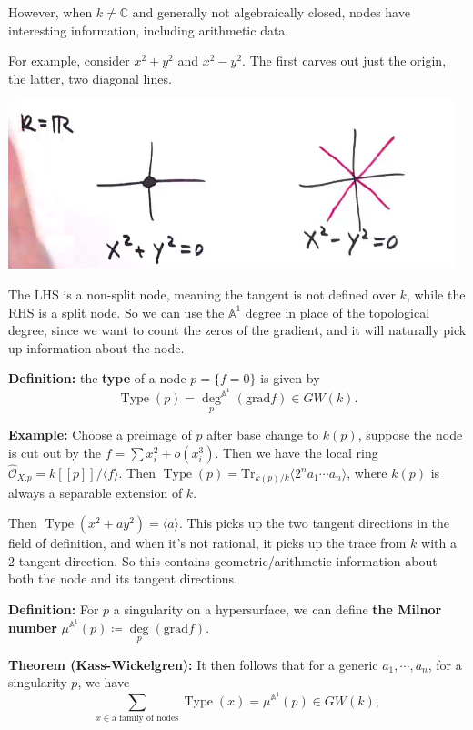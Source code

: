 \documentclass[11pt]{scrreprt}
\theoremstyle{definition}
\newcommand{\CC}[0]{{\mathbb{C}}}
\newcommand{\Af}[0]{{\mathbb{A}}}
\newcommand{\OO}[0]{{\mathcal{O}}}
\newcommand{\Tr}[0]{\mathrm{Tr}}
\newcommand{\grad}[0]{\mathrm{grad}}
\newcommand{\generators}[1]{\langle{#1}\rangle}
\newcommand{\theset}[1]{\{{#1}\}}
\newcommand{\definedas}[0]{\coloneqq}
\begin{document}
However, when \(k\neq \CC\) and generally not algebraically closed,
nodes have interesting information, including arithmetic data.

For example, consider \(x^2+y^2\) and \(x^2-y^2\). The first carves out
just the origin, the latter, two diagonal lines.

\begin{center}
\includegraphics{../assets/2019-03-09-12-18-52.png}
\end{center}

The LHS is a non-split node, meaning the tangent is not defined over
\(k\), while the RHS is a split node. So we can use the \(\Af^1\) degree
in place of the topological degree, since we want to count the zeros of
the gradient, and it will naturally pick up information about the node.

\textbf{Definition:} the \textbf{type} of a node \(p = \theset{f=0}\) is
given by \[
\operatorname{Type}(p) = \underset p \deg^{\Af^1} (\grad f) \in GW(k).
\]

\textbf{Example:} Choose a preimage of \(p\) after base change to
\(k(p)\), suppose the node is cut out by the
\(f = \sum x_i^2 + o(x_i^3)\). Then we have the local ring
\(\widehat\OO_{X. p} = k[[p]] / \generators{f}\). Then
\(\operatorname{Type}(p) = \Tr_{k(p)/ k}\generators{2^n a_1 \cdots a_n}\),
where \(k(p)\) is always a separable extension of \(k\).

Then \(\operatorname{Type}(x^2+ay^2) = \generators{a}\). This picks up the two
tangent directions in the field of definition, and when it's not
rational, it picks up the trace from \(k\) with a 2-tangent direction.
So this contains geometric/arithmetic information about both the node
and its tangent directions.

\textbf{Definition:} For \(p\) a singularity on a hypersurface, we can
define \textbf{the Milnor number}
\(\mu^{\Af^1}(p) \definedas \underset p \deg (\grad f)\).

\textbf{Theorem (Kass-Wickelgren):} It then follows that for a generic
\(a_1,\cdots,a_n\), for a singularity \(p\), we have \[
\sum_{x \in \text{a family of nodes}} \operatorname{Type} (x) = \mu^{\Af^1}(p) \in GW(k),
\]
\end{document}
